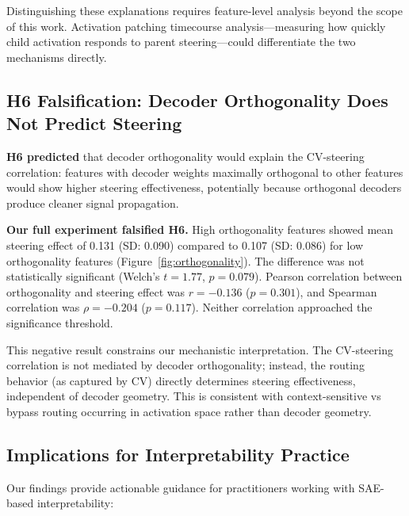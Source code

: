 \documentclass{article}
\begin{document}
Distinguishing these explanations requires feature-level analysis beyond the scope of this work. Activation patching timecourse analysis---measuring how quickly child activation responds to parent steering---could differentiate the two mechanisms directly.

\subsection{H6 Falsification: Decoder Orthogonality Does Not Predict Steering}

\textbf{H6 predicted} that decoder orthogonality would explain the CV-steering correlation: features with decoder weights maximally orthogonal to other features would show higher steering effectiveness, potentially because orthogonal decoders produce cleaner signal propagation.

\textbf{Our full experiment falsified H6.} High orthogonality features showed mean steering effect of 0.131 (SD: 0.090) compared to 0.107 (SD: 0.086) for low orthogonality features (Figure~\ref{fig:orthogonality}). The difference was not statistically significant (Welch's $t = 1.77$, $p = 0.079$). Pearson correlation between orthogonality and steering effect was $r = -0.136$ ($p = 0.301$), and Spearman correlation was $\rho = -0.204$ ($p = 0.117$). Neither correlation approached the significance threshold.

This negative result constrains our mechanistic interpretation. The CV-steering correlation is not mediated by decoder orthogonality; instead, the routing behavior (as captured by CV) directly determines steering effectiveness, independent of decoder geometry. This is consistent with context-sensitive vs bypass routing occurring in activation space rather than decoder geometry.

\subsection{Implications for Interpretability Practice}

Our findings provide actionable guidance for practitioners working with SAE-based interpretability:
\end{document}
